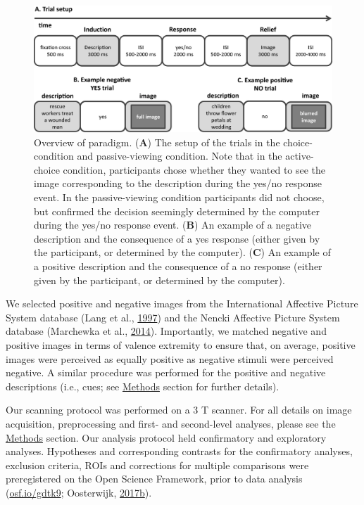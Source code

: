 \documentclass[11pt,american,a4paper,oneside,]{memoir} %
\begin{document}
\begin{figure}
\centering
\includegraphics{_bookdown_files/morbid-curiosity-files/figures/figure_1.pdf}
\caption{\label{fig:fig-morbid-curiosity-1}Overview of paradigm. (\textbf{A}) The setup of the trials in the choice-condition and passive-viewing condition. Note that in the active-choice condition, participants chose whether they wanted to see the image corresponding to the description during the yes/no response event. In the passive-viewing condition participants did not choose, but confirmed the decision seemingly determined by the computer during the yes/no response event. (\textbf{B}) An example of a negative description and the consequence of a yes response (either given by the participant, or determined by the computer). (\textbf{C}) An example of a positive description and the consequence of a no response (either given by the participant, or determined by the computer).}
\end{figure}



We selected positive and negative images from the International Affective Picture System database (Lang et al., \protect\hyperlink{ref-lang1997international}{1997}) and the Nencki Affective Picture System database (Marchewka et al., \protect\hyperlink{ref-marchewka2014nencki}{2014}). Importantly, we matched negative and positive images in terms of valence extremity to ensure that, on average, positive images were perceived as equally positive as negative stimuli were perceived negative. A similar procedure was performed for the positive and negative descriptions (i.e., cues; see \protect\hyperlink{morbid-curiosity-methods}{Methods} section for further details).

Our scanning protocol was performed on a 3 T scanner. For all details on image acquisition, preprocessing and first- and second-level analyses, please see the \protect\hyperlink{morbid-curiosity-methods}{Methods} section. Our analysis protocol held confirmatory and exploratory analyses. Hypotheses and corresponding contrasts for the confirmatory analyses, exclusion criteria, ROIs and corrections for multiple comparisons were preregistered on the Open Science Framework, prior to data analysis (\url{osf.io/gdtk9}; Oosterwijk, \protect\hyperlink{ref-oosterwijk2017prereg}{2017}\protect\hyperlink{ref-oosterwijk2017prereg}{b}).
\end{document}
